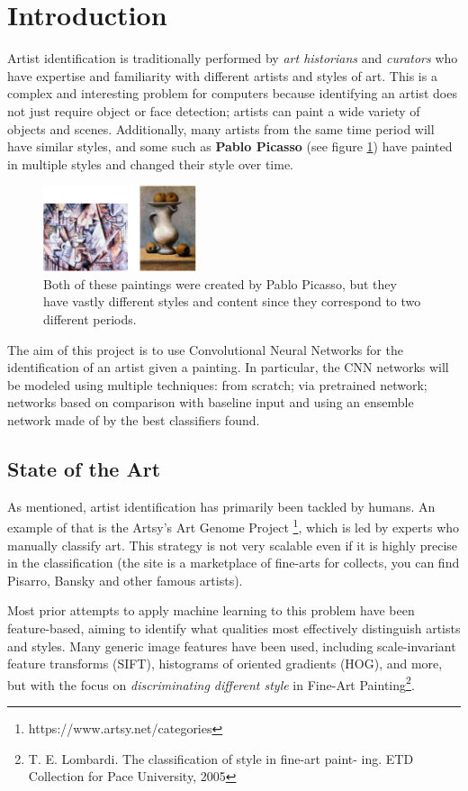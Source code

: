 \section{Introduction}
Artist identification is traditionally performed by \textit{art historians} and \textit{curators} who have expertise and familiarity with different artists and styles of art. This is a complex and interesting problem for computers because identifying an artist does not just require object or face detection; artists can paint a wide variety of objects and scenes. Additionally, many artists from the same time period will have similar styles, and some such as \textbf{Pablo Picasso} (see figure \ref{fig:picasso}) have painted in multiple styles and changed their style over time.

\begin{figure}[H]
	\centering
	\includegraphics[width=0.4\textwidth]{img/picasso.png}
	\caption{Both of these paintings were created by Pablo Picasso, but they have vastly different styles and content since they correspond to two different periods.}
	\label{fig:picasso}
\end{figure}

\noindent The aim of this project is to use Convolutional Neural Networks for the identification of an artist given a painting. In particular, the CNN networks will be modeled using multiple techniques: from scratch; via pretrained network; networks based on comparison with baseline input and using an ensemble network made of by the best classifiers found.


\subsection{State of the Art}
As mentioned, artist identification has primarily been tackled by humans. An example of that is the Artsy's Art Genome Project \footnote{https://www.artsy.net/categories}, which is led by experts who manually classify art. This strategy is not very scalable even if it is highly precise in the classification (the site is a marketplace of fine-arts for collects, you can find Pisarro, Bansky and other famous artists).

Most prior attempts to apply machine learning to this problem have been feature-based, aiming to identify what qualities most effectively distinguish artists and styles. Many generic image features have been used, including scale-invariant feature transforms (SIFT), histograms of oriented gradients (HOG), and more, but with the focus on \textit{discriminating different style} in Fine-Art Painting\footnote{T. E. Lombardi. The classification of style in fine-art paint-
ing. ETD Collection for Pace University, 2005}.

